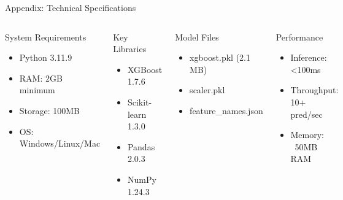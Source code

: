 \documentclass[aspectratio=169]{beamer}
\begin{document}
\begin{frame}{Appendix: Technical Specifications}
\begin{columns}
\begin{block}{System Requirements}
\begin{itemize}
    \item Python 3.11.9
    \item RAM: 2GB minimum
    \item Storage: 100MB
    \item OS: Windows/Linux/Mac
\end{itemize}
\end{block}

\begin{block}{Key Libraries}
\begin{itemize}
    \item XGBoost 1.7.6
    \item Scikit-learn 1.3.0
    \item Pandas 2.0.3
    \item NumPy 1.24.3
\end{itemize}
\end{block}

\begin{block}{Model Files}
\begin{itemize}
    \item xgboost.pkl (2.1 MB)
    \item scaler.pkl
    \item feature\_names.json
\end{itemize}
\end{block}

\begin{block}{Performance}
\begin{itemize}
    \item Inference: <100ms
    \item Throughput: 10+ pred/sec
    \item Memory: ~50MB RAM
\end{itemize}
\end{block}
\end{columns}
\end{frame}
\end{document}
